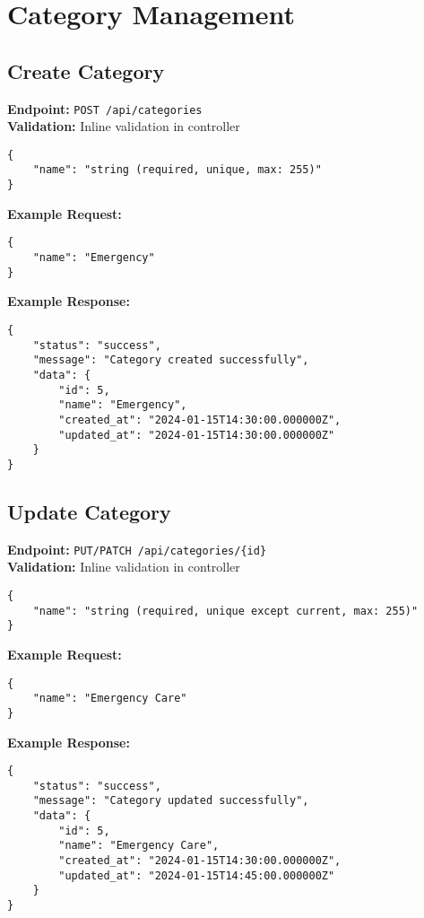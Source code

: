 \documentclass[12pt,a4paper]{article}
\begin{document}
\section{Category Management}

\subsection{Create Category}
\textbf{Endpoint:} \texttt{POST /api/categories}\\
\textbf{Validation:} Inline validation in controller

\begin{lstlisting}[caption=Create Category Request Body]
{
    "name": "string (required, unique, max: 255)"
}
\end{lstlisting}

\textbf{Example Request:}
\begin{lstlisting}[caption=Create Category Example Request]
{
    "name": "Emergency"
}
\end{lstlisting}

\textbf{Example Response:}
\begin{lstlisting}[caption=Create Category Example Response]
{
    "status": "success",
    "message": "Category created successfully",
    "data": {
        "id": 5,
        "name": "Emergency",
        "created_at": "2024-01-15T14:30:00.000000Z",
        "updated_at": "2024-01-15T14:30:00.000000Z"
    }
}
\end{lstlisting}

\subsection{Update Category}
\textbf{Endpoint:} \texttt{PUT/PATCH /api/categories/\{id\}}\\
\textbf{Validation:} Inline validation in controller

\begin{lstlisting}[caption=Update Category Request Body]
{
    "name": "string (required, unique except current, max: 255)"
}
\end{lstlisting}

\textbf{Example Request:}
\begin{lstlisting}[caption=Update Category Example Request]
{
    "name": "Emergency Care"
}
\end{lstlisting}

\textbf{Example Response:}
\begin{lstlisting}[caption=Update Category Example Response]
{
    "status": "success",
    "message": "Category updated successfully",
    "data": {
        "id": 5,
        "name": "Emergency Care",
        "created_at": "2024-01-15T14:30:00.000000Z",
        "updated_at": "2024-01-15T14:45:00.000000Z"
    }
}
\end{lstlisting}
\end{document}
